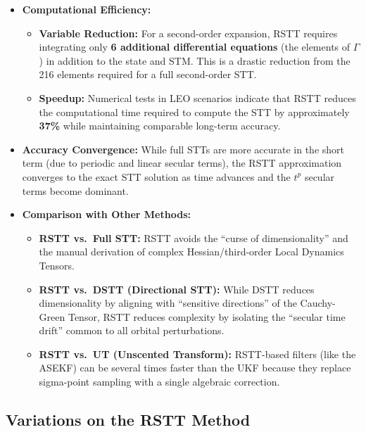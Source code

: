 \documentclass[
  letterpaper,
  DIV=11,
  numbers=noendperiod,
  oneside]{scrartcl}
\providecommand{\tightlist}{%
  \setlength{\itemsep}{0pt}\setlength{\parskip}{0pt}}
\begin{document}
\begin{itemize}
\item
  \textbf{Computational Efficiency:}

  \begin{itemize}
  \tightlist
  \item
    \textbf{Variable Reduction:} For a second-order expansion, RSTT
    requires integrating only \textbf{6 additional differential
    equations} (the elements of \(\Gamma\)) in addition to the state and
    STM. This is a drastic reduction from the 216 elements required for
    a full second-order STT.
  \item
    \textbf{Speedup:} Numerical tests in LEO scenarios indicate that
    RSTT reduces the computational time required to compute the STT by
    approximately \textbf{37\%} while maintaining comparable long-term
    accuracy.
  \end{itemize}
\item
  \textbf{Accuracy Convergence:} While full STTs are more accurate in
  the short term (due to periodic and linear secular terms), the RSTT
  approximation converges to the exact STT solution as time advances and
  the \(t^p\) secular terms become dominant.
\item
  \textbf{Comparison with Other Methods:}

  \begin{itemize}
  \item
    \textbf{RSTT vs.~Full STT:} RSTT avoids the ``curse of
    dimensionality'' and the manual derivation of complex
    Hessian/third-order Local Dynamics Tensors.
  \item
    \textbf{RSTT vs.~DSTT (Directional STT):} While DSTT reduces
    dimensionality by aligning with ``sensitive directions'' of the
    Cauchy-Green Tensor, RSTT reduces complexity by isolating the
    ``secular time drift'' common to all orbital perturbations.
  \item
    \textbf{RSTT vs.~UT (Unscented Transform):} RSTT-based filters (like
    the ASEKF) can be several times faster than the UKF because they
    replace sigma-point sampling with a single algebraic correction.
  \end{itemize}
\end{itemize}

\subsection{Variations on the RSTT
Method}\label{variations-on-the-rstt-method}
\end{document}
